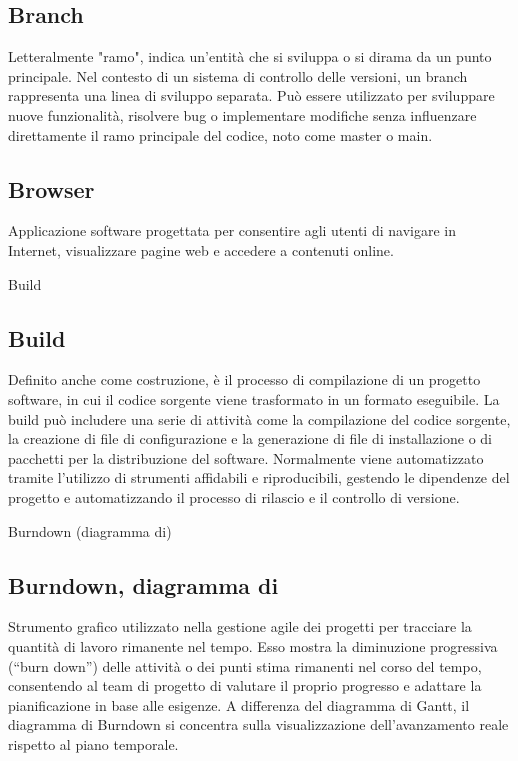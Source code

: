 \hypertarget{sec:branch}{}
\subsection*{Branch}
Letteralmente "ramo", indica un’entità che si sviluppa o si dirama da un punto principale. Nel contesto di un sistema di controllo delle versioni, 
un branch rappresenta una linea di sviluppo separata. Può essere utilizzato per sviluppare nuove funzionalità, risolvere bug o implementare modifiche 
senza influenzare direttamente il ramo principale del codice, noto come master o main.

\hypertarget{sec:browser}{}
\subsection*{Browser}
Applicazione software progettata per consentire agli utenti di navigare in Internet, visualizzare pagine web e accedere a contenuti online.

\hypertarget{sec:build}{Build}
\subsection*{Build}
Definito anche come costruzione, è il processo di compilazione di un progetto software, in cui il codice sorgente viene trasformato in un 
formato eseguibile. La build può includere una serie di attività come la compilazione del codice sorgente, la creazione di file di 
configurazione e la generazione di file di installazione o di pacchetti per la distribuzione del software. Normalmente viene automatizzato 
tramite l’utilizzo di strumenti affidabili e riproducibili, gestendo le dipendenze del progetto e automatizzando il processo di rilascio e 
il controllo di versione.

\hypertarget{sec:diagramma_di_burndown}{Burndown (diagramma di)}
\subsection*{Burndown, diagramma di}
Strumento grafico utilizzato nella gestione agile dei progetti per tracciare la quantità di lavoro rimanente nel tempo. 
Esso mostra la diminuzione progressiva (“burn down”) delle attività o dei punti stima rimanenti nel corso del tempo, 
consentendo al team di progetto di valutare il proprio progresso e adattare la pianificazione in base alle esigenze. 
A differenza del diagramma di Gantt, il diagramma di Burndown si concentra sulla visualizzazione dell’avanzamento reale rispetto al piano temporale.


